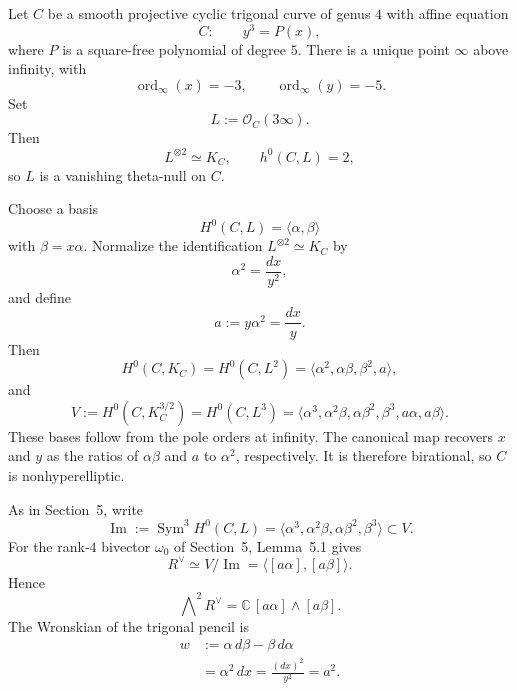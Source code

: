 \documentclass[11pt]{article}
\begin{document}
Let $C$ be a smooth {projective} cyclic trigonal curve of genus $4$ {with affine equation}
\begin{equation}
\label{eq:cyclic-trigonal}
C:\qquad y^3=P(x),
\end{equation}
where $P$ is a square-free polynomial of degree $5$.  There is a unique point $\infty$ above infinity, with
\begin{equation*}
\operatorname{ord}_{\infty}(x)=-3,
\qquad
\operatorname{ord}_{\infty}(y)=-5.
\end{equation*}
Set
\begin{equation*}
L:=\mathcal O_C(3\infty).
\end{equation*}
Then
\begin{equation*}
L^{\otimes 2}\simeq K_C,
\qquad
h^0(C,L)=2,
\end{equation*}
so $L$ is a vanishing theta-null on $C$.

Choose a basis
\begin{equation*}
H^0(C,L)=\langle \alpha,\beta\rangle
\end{equation*}
with $\beta=x\alpha$.  Normalize the identification $L^{\otimes 2}\simeq K_C$ by
\begin{equation*}
\alpha^2=\frac{dx}{y^2},
\end{equation*}
and define
\begin{equation*}
a:=y\alpha^2=\frac{dx}{y}.
\end{equation*}
Then
\begin{equation}
\label{eq:cyclic-H0K}
H^0(C,K_C)
= H^0(C,L^2) =
\langle \alpha^2,\alpha\beta,\beta^2,a\rangle,
\end{equation}
and
\begin{equation}
\label{eq:cyclic-H0K32}
V:=H^0(C,K_C^{3/2})
= H^0(C,L^3) =
\langle
\alpha^3,\alpha^2\beta,\alpha\beta^2,\beta^3,
a\alpha,a\beta
\rangle.
\end{equation}
{These bases follow from the pole orders at infinity. The canonical
map recovers $x$ and $y$ as the ratios of $\alpha\beta$ and $a$ to
$\alpha^2$, respectively. It is therefore birational, so $C$ is
nonhyperelliptic.}

As in Section~5, write
\begin{equation*}
\operatorname{Im}:=\operatorname{Sym}^3H^0(C,L)
=
\langle
\alpha^3,\alpha^2\beta,\alpha\beta^2,\beta^3
\rangle
\subset V.
\end{equation*}
For the rank-$4$ bivector $\omega_0$ of Section~5, Lemma~5.1 gives
\begin{equation*}
R^\vee\simeq V/\operatorname{Im}
=
\langle [a\alpha],[a\beta]\rangle.
\end{equation*}
Hence
\begin{equation}
\label{eq:wedge-null-generator}
\bigwedge\nolimits^2R^\vee
=
\mathbb C\,[a\alpha]\wedge[a\beta].
\end{equation}
The Wronskian of the trigonal pencil is
\begin{align}
\label{eq:w-equals-a2}
w
&:=\alpha\,d\beta-\beta\,d\alpha \\
&=\alpha^2\,dx
=\frac{(dx)^2}{y^2}
=a^2.
\end{align}
\end{document}
